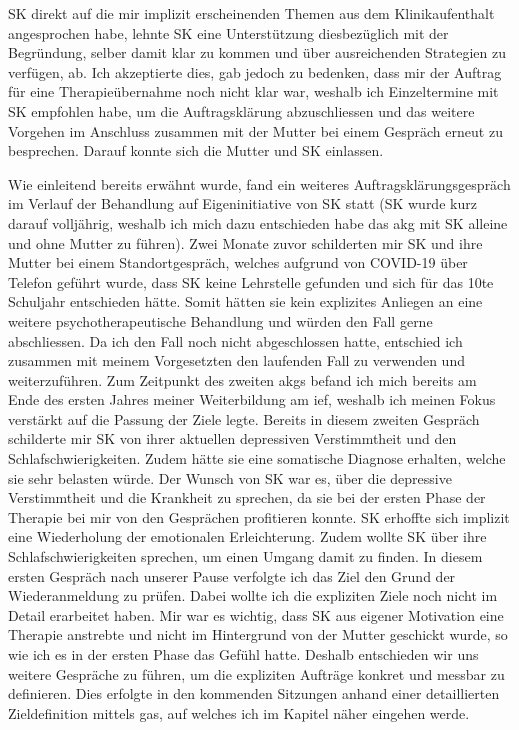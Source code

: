 SK direkt auf die mir implizit erscheinenden Themen aus dem Klinikaufenthalt angesprochen habe, lehnte SK eine Unterstützung diesbezüglich mit der Begründung, selber damit klar zu kommen und über ausreichenden Strategien zu verfügen, ab. Ich akzeptierte dies, gab jedoch zu bedenken, dass mir der Auftrag für eine Therapieübernahme noch nicht klar war, weshalb ich Einzeltermine mit SK empfohlen habe, um die Auftragsklärung abzuschliessen und das weitere Vorgehen im Anschluss zusammen mit der Mutter bei einem Gespräch erneut zu besprechen. Darauf konnte sich die Mutter und SK einlassen.

Wie einleitend bereits erwähnt wurde, fand ein weiteres Auftragsklärungsgespräch im Verlauf der Behandlung auf Eigeninitiative von SK statt (SK wurde kurz darauf volljährig, weshalb ich mich dazu entschieden habe das \ac{akg} mit SK alleine und ohne Mutter zu führen). Zwei Monate zuvor schilderten mir SK und ihre Mutter bei einem Standortgespräch, welches aufgrund von COVID-19 über Telefon geführt wurde, dass SK keine Lehrstelle gefunden und sich für das 10te Schuljahr entschieden hätte. Somit hätten sie kein explizites Anliegen an eine weitere psychotherapeutische Behandlung und würden den Fall gerne abschliessen. Da ich den Fall noch nicht abgeschlossen hatte, entschied ich zusammen mit meinem Vorgesetzten den laufenden Fall zu verwenden und weiterzuführen. Zum Zeitpunkt des zweiten \acp{akg} befand ich mich bereits am Ende des ersten Jahres meiner Weiterbildung am \ac{ief}, weshalb ich meinen Fokus verstärkt auf die Passung der Ziele legte. Bereits in diesem zweiten Gespräch schilderte mir SK von ihrer aktuellen depressiven Verstimmtheit und den Schlafschwierigkeiten. Zudem hätte sie eine somatische Diagnose erhalten, welche sie sehr belasten würde. Der Wunsch von SK war es, über die depressive Verstimmtheit und die Krankheit zu sprechen, da sie bei der ersten Phase der Therapie bei mir von den Gesprächen profitieren konnte. SK erhoffte sich implizit eine Wiederholung der emotionalen Erleichterung. Zudem wollte SK über ihre Schlafschwierigkeiten sprechen, um einen Umgang damit zu finden. In diesem ersten Gespräch nach unserer Pause verfolgte ich das Ziel den Grund der Wiederanmeldung zu prüfen. Dabei wollte ich die expliziten Ziele noch nicht im Detail erarbeitet haben. Mir war es wichtig, dass SK aus eigener Motivation eine Therapie anstrebte und nicht im Hintergrund von der Mutter geschickt wurde, so wie ich es in der ersten Phase das Gefühl hatte. Deshalb entschieden wir uns weitere Gespräche zu führen, um die expliziten Aufträge konkret und messbar zu definieren. Dies erfolgte in den kommenden Sitzungen anhand einer detaillierten Zieldefinition mittels \ac{gas}, auf welches ich im Kapitel  näher eingehen werde.

